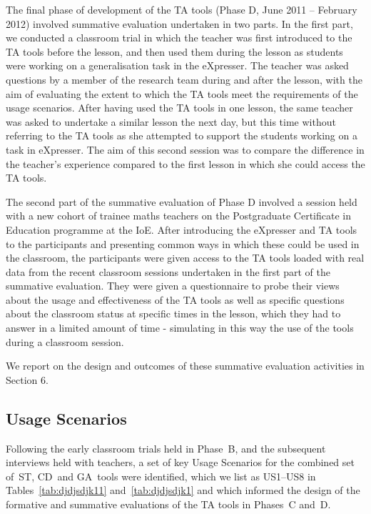 The final phase of development of the TA tools (Phase D, June 2011 –
February 2012) involved summative evaluation undertaken in two
parts. In the first part, we conducted a classroom trial in which the
teacher was first introduced to the TA tools before the lesson, and
then used them during the lesson as students were working on a
generalisation task in the eXpresser. The teacher was asked questions
by a member of the research team during and after the lesson, with the
aim of evaluating the extent to which the TA tools meet the
requirements of the usage scenarios. After having used the TA tools in
one lesson, the same teacher was asked to undertake a similar lesson
the next day, but this time without referring to the TA tools as she
attempted to support the students working on a task in eXpresser. The
aim of this second session was to compare the difference in the
teacher’s experience compared to the first lesson in which she could
access the TA tools.
 
The second part of the summative evaluation of Phase D involved a
session held with a new cohort of trainee maths teachers on the
Postgraduate Certificate in Education programme at the IoE. After
introducing the eXpresser and TA tools to the participants and
presenting common ways in which these could be used in the classroom,
the participants were given access to the TA tools loaded with real
data from the recent classroom sessions undertaken in the first part
of the summative evaluation. They were given a questionnaire to probe
their views about the usage and effectiveness of the TA tools as well
as specific questions about the classroom status at specific times in
the lesson, which they had to answer in a limited amount of time -
simulating in this way the use of the tools during a classroom
session.
 
We report on the design and outcomes of these summative evaluation
activities in Section 6.

\subsection*{Usage Scenarios}
\label{sec:usage-scenarios}

Following the early classroom trials held in Phase~B, and the
subsequent interviews held with teachers, a set of key Usage Scenarios
for the combined set of~ST, CD~and GA~tools were identified, which we
list as US1--US8 in Tables~\ref{tab:djdjsdjk11}
and~\ref{tab:djdjsdjk1} 
and which informed the design of the formative
and summative evaluations of the TA tools in Phases~C and~D.

